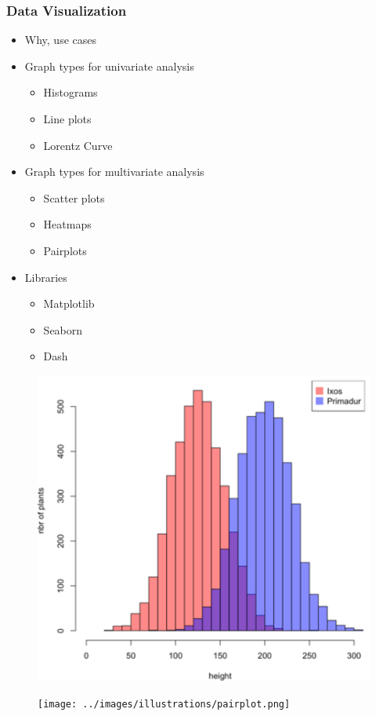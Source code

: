 \begin{frame}\frametitle{Data Visualization}
   \begin{minipage}{0.56\linewidth}
      \begin{itemize}
         \item Why, use cases
         \item Graph types for univariate analysis
         \begin{itemize}
            \item Histograms
            \item Line plots
            \item Lorentz Curve
         \end{itemize}
         \item Graph types for multivariate analysis
         \begin{itemize}
            \item Scatter plots
            \item Heatmaps
            \item Pairplots
         \end{itemize}
         \item Libraries
         \begin{itemize}
            \item Matplotlib
            \item Seaborn
            \item Dash
         \end{itemize}
      \end{itemize}
   \end{minipage}
   \begin{minipage}{0.4\linewidth}
      \begin{figure}[H]
         \includegraphics[scale=.21]{../src/images/illustrations/viz_histograms.png}
      \end{figure}
      \begin{figure}[H]
         \texttt{[image: ../images/illustrations/pairplot.png]}
      \end{figure}
   \end{minipage}
\end{frame}



